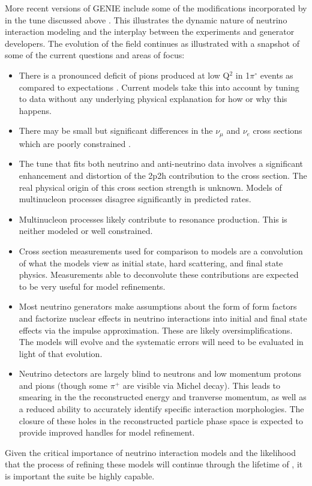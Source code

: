 More recent versions of GENIE include some of the modifications incorporated by  in the tune discussed above \cite{Alam:2015nkk}.  This illustrates the dynamic nature of neutrino interaction modeling and the interplay between the experiments and generator developers.  The evolution of the field continues as illustrated with a snapshot of some of the current questions and areas of focus:
\begin{itemize}
    \item There is a pronounced deficit of pions produced at low Q$^{2}$ in 1$\pi^{\circ}$ events as compared to expectations \cite{BercellieNUINT2018,Altinok:2017xua,Aliaga:2015wva,McGivern:2016bwh,novaminosPC}.  Current models take this into account by tuning to data without any underlying physical explanation for how or why this happens.
    \item There may be small but significant differences in the $\nu_{\mu}$ and $\nu_{e}$  cross sections which are poorly constrained \cite{Day2012gb}.
    \item The  tune that fits both neutrino and anti-neutrino  data involves a significant enhancement and distortion of the 2p2h contribution to the cross section.  The real physical origin of this cross section strength is unknown.  Models of multinucleon processes disagree significantly in predicted rates.
    \item Multinucleon processes likely contribute to resonance production.  This is neither modeled or well constrained.
    \item Cross section measurements used for comparison to models are a convolution of what the models view as initial state, hard scattering, and final state physics.   Measurements able to deconvolute these contributions are expected to be very useful for model refinements.  
    \item Most neutrino generators make assumptions about the form of form factors and factorize nuclear effects in neutrino interactions into initial and final state effects via the impulse approximation.  These are likely oversimplifications.  The models will evolve and the systematic errors will need to be evaluated in light of that evolution. 
    \item  Neutrino detectors are largely blind to neutrons and low momentum protons and pions (though some $\pi^{+}$ are visible via Michel decay).  This leads to smearing in the the reconstructed energy and tranverse momentum, as well as a reduced ability to accurately identify specific interaction morphologies.  The closure of these holes in the reconstructed particle phase space is expected to provide improved handles for model refinement. 
\end{itemize}
Given the critical importance of neutrino interaction models and the likelihood that the process of refining these models will continue through the lifetime of , it is important the    suite be highly capable.   


